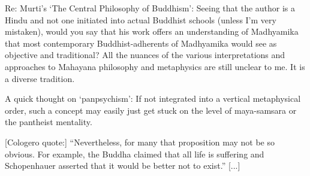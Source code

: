 \begin{footnotesize}
\begin{sffamily}
Re: Murti's `The Central Philosophy of Buddhism’: Seeing that the author is a Hindu
and not one initiated into actual Buddhist schools (unless I'm very mistaken), would you say that his work
offers an understanding of Madhyamika that most contemporary Buddhist-adherents of Madhyamika would see as objective
and traditional? All the nuances of the various interpretations and approaches to Mahayana philosophy and metaphysics
are still unclear to me. It is a diverse tradition.

A quick thought on `panpsychism’: If not integrated into a vertical metaphysical order, such a
concept may easily just get stuck on the level of maya-samsara or the pantheist mentality.

[Cologero quote:] “Nevertheless, for many that proposition may not be so obvious. For example, the Buddha claimed that
all life is suffering and Schopenhauer asserted that it would be better not to exist.” [...]


\end{sffamily}
\end{footnotesize}
